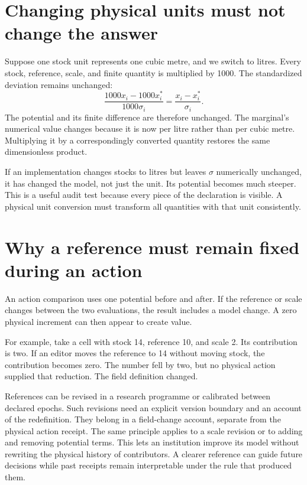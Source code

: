 \section{Changing physical units must not change the answer}
Suppose one stock unit represents one cubic metre, and we switch to litres. Every stock, reference, scale, and finite quantity is multiplied by 1000. The standardized deviation remains unchanged:
\begin{equation}
 \frac{1000x_i-1000x_i^*}{1000\sigma_i}
 =\frac{x_i-x_i^*}{\sigma_i}.
\end{equation}
The potential and its finite difference are therefore unchanged. The marginal's numerical value changes because it is now per litre rather than per cubic metre. Multiplying it by a correspondingly converted quantity restores the same dimensionless product.

If an implementation changes stocks to litres but leaves \(\sigma\) numerically unchanged, it has changed the model, not just the unit. Its potential becomes much steeper. This is a useful audit test because every piece of the declaration is visible. A physical unit conversion must transform all quantities with that unit consistently.

\section{Why a reference must remain fixed during an action}
An action comparison uses one potential before and after. If the reference or scale changes between the two evaluations, the result includes a model change. A zero physical increment can then appear to create value.

For example, take a cell with stock 14, reference 10, and scale 2. Its contribution is two. If an editor moves the reference to 14 without moving stock, the contribution becomes zero. The number fell by two, but no physical action supplied that reduction. The field definition changed.

References can be revised in a research programme or calibrated between declared epochs. Such revisions need an explicit version boundary and an account of the redefinition. They belong in a field-change account, separate from the physical action receipt. The same principle applies to a scale revision or to adding and removing potential terms. This lets an institution improve its model without rewriting the physical history of contributors. A clearer reference can guide future decisions while past receipts remain interpretable under the rule that produced them.

